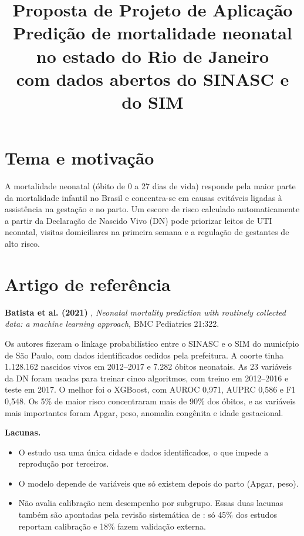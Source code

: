 \documentclass[12pt]{article}
\title{Proposta de Projeto de Aplicação\\
Predição de mortalidade neonatal no estado do Rio de Janeiro\\
com dados abertos do SINASC e do SIM}
\author{\nomeautor\inst{1}}
\begin{document}
\maketitle

\section{Tema e motivação}

A mortalidade neonatal (óbito de 0 a 27 dias de vida) responde pela maior parte da mortalidade infantil no Brasil e concentra-se em causas evitáveis ligadas à assistência na gestação e no parto. Um escore de risco calculado automaticamente a partir da Declaração de Nascido Vivo (DN) pode priorizar leitos de UTI neonatal, visitas domiciliares na primeira semana e a regulação de gestantes de alto risco.

\section{Artigo de referência}

\textbf{Batista et al. (2021)} \cite{batista2021}, \textit{Neonatal mortality prediction with routinely collected data: a machine learning approach}, BMC Pediatrics 21:322.

Os autores fizeram o linkage probabilístico entre o SINASC e o SIM do município de São Paulo, com dados identificados cedidos pela prefeitura. A coorte tinha 1.128.162 nascidos vivos em 2012--2017 e 7.282 óbitos neonatais. As 23 variáveis da DN foram usadas para treinar cinco algoritmos, com treino em 2012--2016 e teste em 2017. O melhor foi o XGBoost, com AUROC 0,971, AUPRC 0,586 e F1 0,548. Os 5\% de maior risco concentraram mais de 90\% dos óbitos, e as variáveis mais importantes foram Apgar, peso, anomalia congênita e idade gestacional.

\textbf{Lacunas.}
\begin{itemize}
  \item O estudo usa uma única cidade e dados identificados, o que impede a reprodução por terceiros.
  \item O modelo depende de variáveis que só existem depois do parto (Apgar, peso).
  \item Não avalia calibração nem desempenho por subgrupo. Essas duas lacunas também são apontadas pela revisão sistemática de \cite{mangold2021}: só 45\% dos estudos reportam calibração e 18\% fazem validação externa.
\end{itemize}
\end{document}
